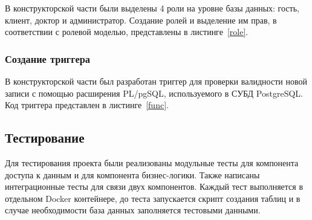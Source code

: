 В конструкторской части были выделены 4 роли на уровне базы данных: гость, клиент, доктор и администратор. Создание ролей и выделение им прав, в соответствии с ролевой моделью, представлены в листинге~\ref{role}. 


\subsubsection{Создание триггера}

В конструкторской части был разработан триггер для проверки валидности новой записи с помощью расширения PL/pgSQL, используемого в СУБД PostgreSQL. Код триггера представлен в листинге~\ref{func}. 


\subsection{Тестирование}

Для тестирования проекта были реализованы модульные тесты для компонента доступа к данным и для компонента бизнес-логики. Также написаны интеграционные тесты для связи двух компонентов. Каждый тест выполняется в отдельном Docker контейнере, до теста запускается скрипт создания таблиц и в случае необходимости база данных заполняется тестовыми данными. 

